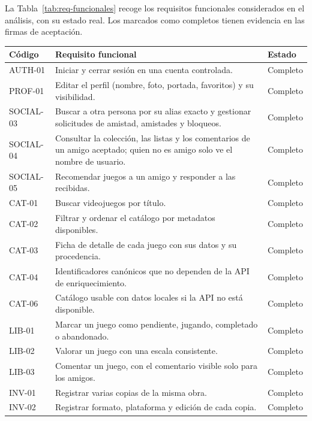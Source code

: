 La Tabla~\ref{tab:req-funcionales} recoge los requisitos funcionales considerados en el
análisis, con su estado real. Los marcados como completos tienen evidencia en las firmas de
aceptación.

\begin{table}[htp]
\centering
\tablecompact
\begin{tabularx}{\textwidth}{ | L{0.15\textwidth} | Y | C{0.14\textwidth} | }
    \hline
    \textbf{Código} & \textbf{Requisito funcional} & \textbf{Estado} \\
    \hline
    AUTH-01 & Iniciar y cerrar sesión en una cuenta controlada. & Completo \\
    \hline
    PROF-01 & Editar el perfil (nombre, foto, portada, favoritos) y su visibilidad. & Completo \\
    \hline
    SOCIAL-03 & Buscar a otra persona por su alias exacto y gestionar solicitudes de amistad, amistades y bloqueos. & Completo \\
    \hline
    SOCIAL-04 & Consultar la colección, las listas y los comentarios de un amigo aceptado; quien no es amigo solo ve el nombre de usuario. & Completo \\
    \hline
    SOCIAL-05 & Recomendar juegos a un amigo y responder a las recibidas. & Completo \\
    \hline
    CAT-01 & Buscar videojuegos por título. & Completo \\
    \hline
    CAT-02 & Filtrar y ordenar el catálogo por metadatos disponibles. & Completo \\
    \hline
    CAT-03 & Ficha de detalle de cada juego con sus datos y su procedencia. & Completo \\
    \hline
    CAT-04 & Identificadores canónicos que no dependen de la API de enriquecimiento. & Completo \\
    \hline
    CAT-06 & Catálogo usable con datos locales si la API no está disponible. & Completo \\
    \hline
    LIB-01 & Marcar un juego como pendiente, jugando, completado o abandonado. & Completo \\
    \hline
    LIB-02 & Valorar un juego con una escala consistente. & Completo \\
    \hline
    LIB-03 & Comentar un juego, con el comentario visible solo para los amigos. & Completo \\
    \hline
    INV-01 & Registrar varias copias de la misma obra. & Completo \\
    \hline
    INV-02 & Registrar formato, plataforma y edición de cada copia. & Completo \\

\end{tabularx}
\end{table}
